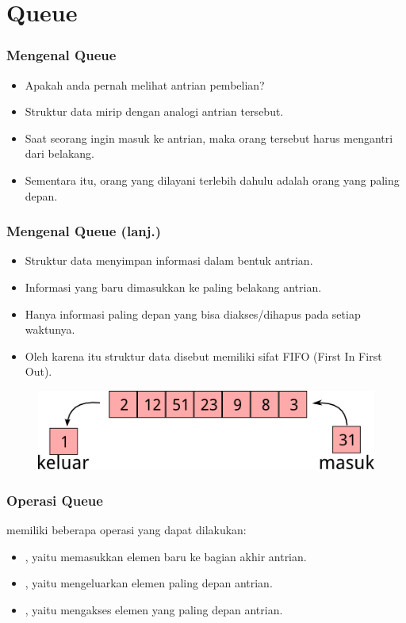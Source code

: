 \section{Queue}
\frame{\sectionpage}

\begin{frame}
\frametitle{Mengenal Queue}
\begin{itemize}
  \item Apakah anda pernah melihat antrian pembelian?
  \item Struktur data  mirip dengan analogi antrian tersebut.
  \item Saat seorang ingin masuk ke antrian, maka orang tersebut harus mengantri dari belakang. \item Sementara itu, orang yang dilayani terlebih dahulu adalah orang yang paling depan.
\end{itemize}
\end{frame}

\begin{frame}
\frametitle{Mengenal Queue (lanj.)}
\begin{itemize}
  \item Struktur data  menyimpan informasi dalam bentuk antrian.
  \item Informasi yang baru dimasukkan ke paling belakang antrian.
  \item Hanya informasi paling depan yang bisa diakses/dihapus pada setiap waktunya.
  \item Oleh karena itu struktur data  disebut memiliki sifat FIFO (First In First Out).
\end{itemize}

\begin{figure}
  \centering
  \includegraphics[width=7 cm]{asset/queue.png}
\end{figure}
\end{frame}

\begin{frame}
\frametitle{Operasi Queue}

 memiliki beberapa operasi yang dapat dilakukan:
\begin{itemize}
  \item {}, yaitu memasukkan elemen baru ke bagian akhir antrian.
  \item {}, yaitu mengeluarkan elemen paling depan antrian.
  \item {}, yaitu mengakses elemen yang paling depan antrian.
\end{itemize}
\end{frame}


